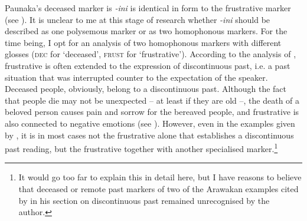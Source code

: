  Paunaka’s deceased marker is \textit{-ini} is identical in form to the frustrative marker (see ). It is unclear to me at this stage of research whether \textit{-ini} should be described as one polysemous marker or as two homophonous markers. For the time being, I opt for an analysis of two homophonous markers with different glosses (\textsc{dec} for ‘deceased’, \textsc{frust} for ‘frustrative’).
According to the analysis of \citet[490--491]{Overall2017}, frustrative is often extended to the expression of discontinuous past, i.e. a past situation that was interrupted counter to the expectation of the speaker. Deceased people, obviously, belong to a discontinuous past. Although the fact that people die may not be unexpected – at least if they are old –, the death of a beloved person causes pain and sorrow for the bereaved people, and frustrative is also connected to negative emotions (see ). However, even in the examples given by  \citet[490--492]{Overall2017}, it is in most cases not the frustrative alone that establishes a discontinuous past reading, but the frustrative together with another specialised marker.\footnote{It would go too far to explain this in detail here, but I have reasons to believe that deceased or remote past markers of two of the Arawakan examples cited by \citet[]{Overall2017} in his section on discontinuous past remained unrecognised by the author.}  %

